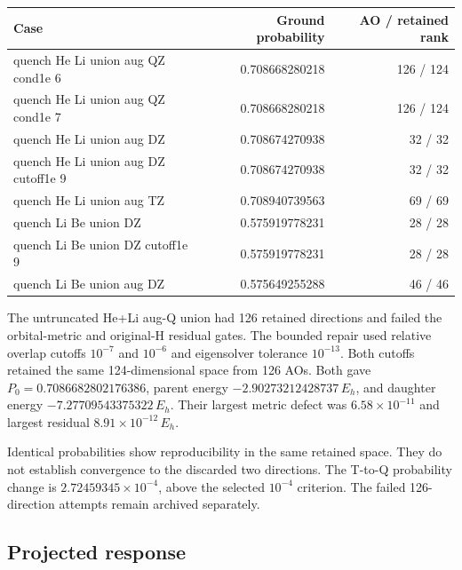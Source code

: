 \documentclass[
  10pt,
]{article}
\begin{document}
\begin{longtable}[]{@{}lrr@{}}
\toprule\noalign{}
Case & Ground probability & AO / retained rank \\
\midrule\noalign{}
\endhead
\bottomrule\noalign{}
\endlastfoot
quench He Li union aug QZ cond1e 6 & 0.708668280218 & 126 / 124 \\
quench He Li union aug QZ cond1e 7 & 0.708668280218 & 126 / 124 \\
quench He Li union aug DZ & 0.708674270938 & 32 / 32 \\
quench He Li union aug DZ cutoff1e 9 & 0.708674270938 & 32 / 32 \\
quench He Li union aug TZ & 0.708940739563 & 69 / 69 \\
quench Li Be union DZ & 0.575919778231 & 28 / 28 \\
quench Li Be union DZ cutoff1e 9 & 0.575919778231 & 28 / 28 \\
quench Li Be union aug DZ & 0.575649255288 & 46 / 46 \\
\end{longtable}

The untruncated He+Li aug-Q union had 126 retained directions and failed
the orbital-metric and original-H residual gates. The bounded repair
used relative overlap cutoffs \(10^{-7}\) and \(10^{-6}\) and
eigensolver tolerance \(10^{-13}\). Both cutoffs retained the same
124-dimensional space from 126 AOs. Both gave
\(P_0=0.7086682802176386\), parent energy \(-2.90273212428737\,E_h\),
and daughter energy \(-7.27709543375322\,E_h\). Their largest metric
defect was \(6.58\times10^{-11}\) and largest residual
\(8.91\times10^{-12}\,E_h\).

Identical probabilities show reproducibility in the same retained space.
They do not establish convergence to the discarded two directions. The
T-to-Q probability change is \(2.72459345\times10^{-4}\), above the
selected \(10^{-4}\) criterion. The failed 126-direction attempts remain
archived separately.

\hypertarget{projected-response}{%
\subsection{Projected response}\label{projected-response}}
\end{document}
